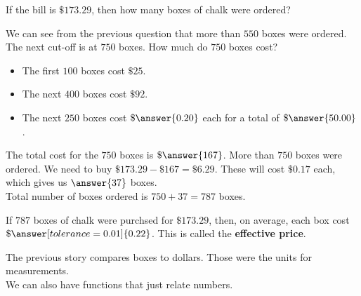 \documentclass{ximera}
\begin{document}
\begin{question}
If the bill is $\$173.29$, then how many boxes of chalk were ordered?

\begin{explanation}

We can see from the previous question that more than $550$ boxes were ordered.  The next cut-off is at $750$ boxes.  How much do $750$ boxes cost? \\

\begin{itemize}
\item The first $100$ boxes cost $\$25$.
\item The next $400$ boxes cost $\$92$.
\item The next $250$ boxes cost $\$\answer{0.20}$ each for a total of $\$\answer{50.00}$.
\end{itemize}
The total cost for the $750$ boxes is $\$\answer{167}$. More than $750$ boxes were ordered.  We need to buy $\$173.29 - \$167 = \$6.29$.  These will cost $\$0.17$ each, which gives us $\answer{37}$ boxes.  \\


Total number of boxes ordered is $750 + 37 = 787$ boxes.


\end{explanation}
\end{question}



\begin{question}
If $787$ boxes of chalk were purchsed for $\$173.29$, then, on average, each box cost $\$\answer[tolerance=0.01]{0.22}$. This is called the \textbf{effective price}.
\end{question}



The previous story compares boxes to dollars.  Those were the units for measurements. \\



We can also have functions that just relate numbers. \\
\end{document}
